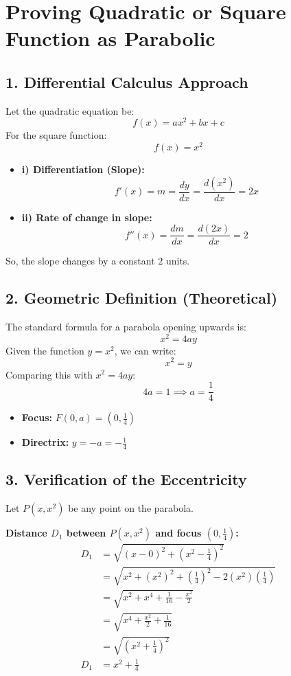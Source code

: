 \documentclass{article}
\begin{document}
\section{Proving Quadratic or Square Function as Parabolic}

\subsection*{1. Differential Calculus Approach}
Let the quadratic equation be:
\[ f(x) = ax^2 + bx + c \]
For the square function:
\[ f(x) = x^2 \]

\begin{itemize}
    \item \textbf{i) Differentiation (Slope):}
    \[ f'(x) = m = \frac{dy}{dx} = \frac{d(x^2)}{dx} = 2x \]
    
    \item \textbf{ii) Rate of change in slope:}
    \[ f''(x) = \frac{dm}{dx} = \frac{d(2x)}{dx} = 2 \]
\end{itemize}
So, the slope changes by a constant $2$ units.

\subsection*{2. Geometric Definition (Theoretical)}
The standard formula for a parabola opening upwards is:
\[ x^2 = 4ay \]
Given the function $y = x^2$, we can write:
\[ x^2 = y \]
Comparing this with $x^2 = 4ay$:
\[ 4a = 1 \implies a = \frac{1}{4} \]

\begin{itemize}
    \item \textbf{Focus:} $F(0, a) = (0, \frac{1}{4})$
    \item \textbf{Directrix:} $y = -a = -\frac{1}{4}$
\end{itemize}

\subsection*{3. Verification of the Eccentricity}
Let $P(x, x^2)$ be any point on the parabola.

\textbf{Distance $D_1$ between $P(x, x^2)$ and focus $(0, \frac{1}{4})$:}
\begin{align*}
D_1 &= \sqrt{(x-0)^2 + \left(x^2 - \frac{1}{4}\right)^2} \\
&= \sqrt{x^2 + (x^2)^2 + \left(\frac{1}{4}\right)^2 - 2(x^2)\left(\frac{1}{4}\right)} \\
&= \sqrt{x^2 + x^4 + \frac{1}{16} - \frac{x^2}{2}} \\
&= \sqrt{x^4 + \frac{x^2}{2} + \frac{1}{16}} \\
&= \sqrt{\left(x^2 + \frac{1}{4}\right)^2} \\
D_1 &= x^2 + \frac{1}{4}
\end{align*}
\end{document}

